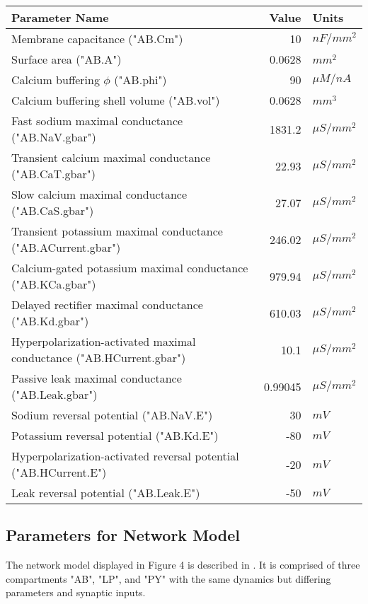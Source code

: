 \documentclass[utf8]{frontiers_suppmat} %
\begin{document}
		\begin{center}
			\begin{tabular}{|l|r|l|}
				\hline 
				\textbf{Parameter Name} & \textbf{Value} & \textbf{Units} \\ 
				\hline 
				Membrane capacitance ("AB.Cm") & 10 & ${nF}/{mm^2}$ \\ 
				\hline 
				Surface area ("AB.A") & 0.0628 & $mm^2$ \\
				\hline
				Calcium buffering $\phi$ ("AB.phi") & 90 & $\mu M / nA$ \\
				\hline
				Calcium buffering shell volume ("AB.vol") & 0.0628 & $mm^3$ \\
				\hline 
				Fast sodium maximal conductance ("AB.NaV.gbar") & 1831.2 & $\mu S/mm^2$ \\ 
				\hline
				Transient calcium maximal conductance ("AB.CaT.gbar") & 22.93 & $\mu S/mm^2$ \\ 
				\hline 
				Slow calcium maximal conductance ("AB.CaS.gbar") & 27.07 & $\mu S/mm^2$ \\ 
				\hline 
				Transient potassium maximal conductance ("AB.ACurrent.gbar") & 246.02 & $\mu S/mm^2$ \\ 
				\hline 
				Calcium-gated potassium maximal conductance ("AB.KCa.gbar") & 979.94 & $\mu S/mm^2$ \\ 
				\hline 
				Delayed rectifier maximal conductance ("AB.Kd.gbar") & 610.03 & $\mu S/mm^2$ \\ 
				\hline
				Hyperpolarization-activated maximal conductance ("AB.HCurrent.gbar") & 10.1 & $\mu S/mm^2$ \\ 
				\hline 
				Passive leak maximal conductance ("AB.Leak.gbar") & 0.99045 & $\mu S/mm^2$ \\ 
				\hline 
				Sodium reversal potential ("AB.NaV.E") & 30 & $mV$ \\ 
				\hline 
				Potassium reversal potential ("AB.Kd.E") & -80 & $mV$ \\ 
				\hline
				Hyperpolarization-activated reversal potential ("AB.HCurrent.E") & -20 & $mV$ \\
				\hline
				Leak reversal potential ("AB.Leak.E") & -50 & $mV$ \\
				\hline
			\end{tabular} 
		\end{center}

	\subsection{Parameters for Network Model}
		The network model displayed in Figure 4 is described in \cite{prinzAlternativeHandtuningConductancebased2003, prinzSimilarNetworkActivity2004}. It is comprised of three compartments "AB", "LP", and "PY" with the same dynamics but differing parameters and synaptic inputs.
		
\end{document}
